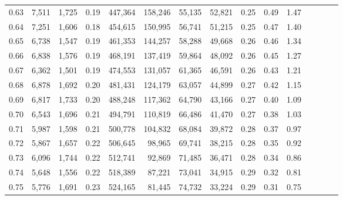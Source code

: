 \begin{tabular}{rrrcrrrrrrrrrrr}
0.63 &   7,511 &  1,725 &                                       0.19 &  447,364 &  158,246 &   55,135 &   52,821 &  0.25 &  0.49 &                         1.47 \\
0.64 &   7,251 &  1,606 &                                       0.18 &  454,615 &  150,995 &   56,741 &   51,215 &  0.25 &  0.47 &                         1.40 \\
0.65 &   6,738 &  1,547 &                                       0.19 &  461,353 &  144,257 &   58,288 &   49,668 &  0.26 &  0.46 &                         1.34 \\
0.66 &   6,838 &  1,576 &                                       0.19 &  468,191 &  137,419 &   59,864 &   48,092 &  0.26 &  0.45 &                         1.27 \\
0.67 &   6,362 &  1,501 &                                       0.19 &  474,553 &  131,057 &   61,365 &   46,591 &  0.26 &  0.43 &                         1.21 \\
0.68 &   6,878 &  1,692 &                                       0.20 &  481,431 &  124,179 &   63,057 &   44,899 &  0.27 &  0.42 &                         1.15 \\
0.69 &   6,817 &  1,733 &                                       0.20 &  488,248 &  117,362 &   64,790 &   43,166 &  0.27 &  0.40 &                         1.09 \\
0.70 &   6,543 &  1,696 &                                       0.21 &  494,791 &  110,819 &   66,486 &   41,470 &  0.27 &  0.38 &                         1.03 \\
0.71 &   5,987 &  1,598 &                                       0.21 &  500,778 &  104,832 &   68,084 &   39,872 &  0.28 &  0.37 &                         0.97 \\
0.72 &   5,867 &  1,657 &                                       0.22 &  506,645 &   98,965 &   69,741 &   38,215 &  0.28 &  0.35 &                         0.92 \\
0.73 &   6,096 &  1,744 &                                       0.22 &  512,741 &   92,869 &   71,485 &   36,471 &  0.28 &  0.34 &                         0.86 \\
0.74 &   5,648 &  1,556 &                                       0.22 &  518,389 &   87,221 &   73,041 &   34,915 &  0.29 &  0.32 &                         0.81 \\
0.75 &   5,776 &  1,691 &                                       0.23 &  524,165 &   81,445 &   74,732 &   33,224 &  0.29 &  0.31 &                         0.75 \\

\end{tabular}
